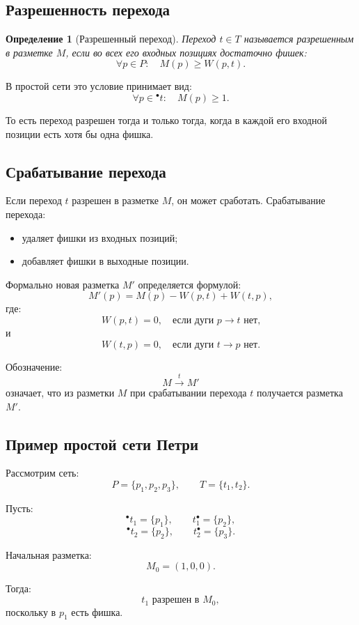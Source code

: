 \documentclass[12pt,a4paper]{article}
\newtheorem{definition}{Определение}
\begin{document}
\subsection{Разрешенность перехода}

\begin{definition}[Разрешенный переход]
Переход $t \in T$ называется разрешенным в разметке $M$, если во всех его входных позициях достаточно фишек:
\[
\forall p \in P:
\quad
M(p) \ge W(p,t).
\]
\end{definition}

В простой сети это условие принимает вид:
\[
\forall p \in {}^\bullet t:
\quad
M(p) \ge 1.
\]

То есть переход разрешен тогда и только тогда, когда в каждой его входной позиции есть хотя бы одна фишка.

\subsection{Срабатывание перехода}

Если переход $t$ разрешен в разметке $M$, он может сработать. Срабатывание перехода:
\begin{itemize}
    \item удаляет фишки из входных позиций;
    \item добавляет фишки в выходные позиции.
\end{itemize}

Формально новая разметка $M'$ определяется формулой:
\[
M'(p) = M(p) - W(p,t) + W(t,p),
\]
где:
\[
W(p,t)=0,
\quad \text{если дуги } p \to t \text{ нет,}
\]
и
\[
W(t,p)=0,
\quad \text{если дуги } t \to p \text{ нет.}
\]

Обозначение:
\[
M \xrightarrow{t} M'
\]
означает, что из разметки $M$ при срабатывании перехода $t$ получается разметка $M'$.

\subsection{Пример простой сети Петри}

Рассмотрим сеть:
\[
P = \{p_1,p_2,p_3\},
\qquad
T = \{t_1,t_2\}.
\]

Пусть:
\[
{}^\bullet t_1 = \{p_1\},
\qquad
t_1^\bullet = \{p_2\},
\]
\[
{}^\bullet t_2 = \{p_2\},
\qquad
t_2^\bullet = \{p_3\}.
\]

Начальная разметка:
\[
M_0 = (1,0,0).
\]

Тогда:
\[
t_1 \text{ разрешен в } M_0,
\]
поскольку в $p_1$ есть фишка.
\end{document}
